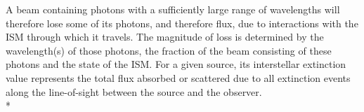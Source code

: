 \documentclass[12pt, a4paper]{report}
\begin{document}
A beam containing photons with a sufficiently large range of wavelengths will therefore lose some of its photons, and therefore flux, due to interactions with the ISM through which it travels. The magnitude of loss is determined by the wavelength(s) of those photons, the fraction of the beam consisting of these photons and the state of the ISM. For a given source, its interstellar extinction value represents the total flux absorbed or scattered due to all extinction events along the line-of-sight between the source and the observer.\\*









\end{document}
